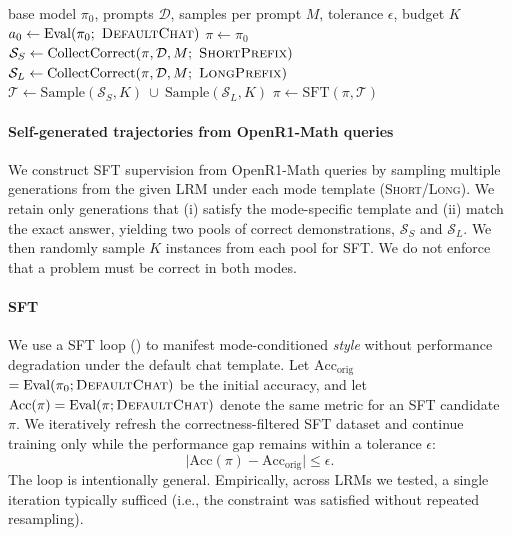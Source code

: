 \begin{algorithm}[t]
\caption{SFT for mode selection}
\label{alg:sft}
\small
\begin{algorithmic}[1]
\Require base model $\pi_0$, prompts $\mathcal{D}$, samples per prompt $M$, tolerance $\epsilon$, budget $K$
\State $a_0 \gets \mathrm{Eval}(\pi_0;\ \textsc{DefaultChat})$ 
\State $\pi \gets \pi_0$
  \State $\mathcal{S}_{S} \gets \mathrm{CollectCorrect}(\pi,\mathcal{D},M;\ \textsc{ShortPrefix})$
  \State $\mathcal{S}_{L} \gets \mathrm{CollectCorrect}(\pi,\mathcal{D},M;\ \textsc{LongPrefix})$
  \State $\mathcal{T} \gets \mathrm{Sample}(\mathcal{S}_{S},K)\ \cup\ \mathrm{Sample}(\mathcal{S}_{L},K)$
  \State $\pi \gets \mathrm{SFT}(\pi,\mathcal{T})$
\EndWhile
\end{algorithmic}
\end{algorithm}

\paragraph{Self-generated trajectories from OpenR1-Math queries}
We construct SFT supervision from OpenR1-Math queries by sampling multiple generations from the given LRM under each mode template (\textsc{Short}/\textsc{Long}).
We retain only generations that (i) satisfy the mode-specific template and (ii) match the exact answer, yielding two pools of correct demonstrations, $\mathcal{S}_{S}$ and $\mathcal{S}_{L}$.
We then randomly sample $K$ instances from each pool for SFT.
We do not enforce that a problem must be correct in both modes. 

\paragraph{SFT}
We use a SFT loop () to manifest mode-conditioned \emph{style} without performance degradation under the default chat template.
Let $\mathrm{Acc}_{\mathrm{orig}}$ $=\mathrm{Eval}(\pi_0;\textsc{DefaultChat})$ be the initial accuracy, and let $\mathrm{Acc}(\pi)=\mathrm{Eval}(\pi;\textsc{DefaultChat})$ denote the same metric for an SFT candidate $\pi$.
We iteratively refresh the correctness-filtered SFT dataset and continue training only while the performance gap remains within a tolerance $\epsilon$:
\[
\big|\mathrm{Acc}(\pi) - \mathrm{Acc}_{\mathrm{orig}}\big| \le \epsilon.
\]
The loop is intentionally general. Empirically, across LRMs we tested, a single iteration typically sufficed (i.e., the constraint was satisfied without repeated resampling).

